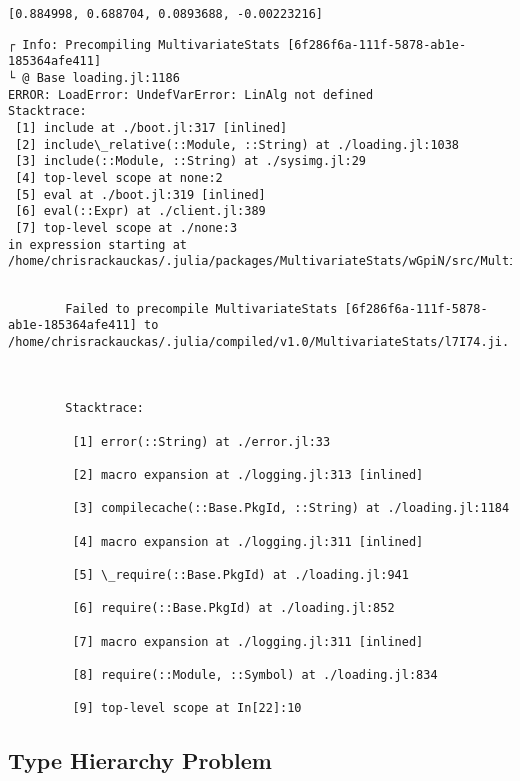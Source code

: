 \documentclass[11pt]{article}
\begin{document}
    \begin{Verbatim}[commandchars=\\\{\}]
[0.884998, 0.688704, 0.0893688, -0.00223216]

    \end{Verbatim}

    \begin{Verbatim}[commandchars=\\\{\}]
┌ Info: Precompiling MultivariateStats [6f286f6a-111f-5878-ab1e-185364afe411]
└ @ Base loading.jl:1186
ERROR: LoadError: UndefVarError: LinAlg not defined
Stacktrace:
 [1] include at ./boot.jl:317 [inlined]
 [2] include\_relative(::Module, ::String) at ./loading.jl:1038
 [3] include(::Module, ::String) at ./sysimg.jl:29
 [4] top-level scope at none:2
 [5] eval at ./boot.jl:319 [inlined]
 [6] eval(::Expr) at ./client.jl:389
 [7] top-level scope at ./none:3
in expression starting at /home/chrisrackauckas/.julia/packages/MultivariateStats/wGpiN/src/MultivariateStats.jl:8

    \end{Verbatim}

    \begin{Verbatim}[commandchars=\\\{\}]

        Failed to precompile MultivariateStats [6f286f6a-111f-5878-ab1e-185364afe411] to /home/chrisrackauckas/.julia/compiled/v1.0/MultivariateStats/l7I74.ji.

        

        Stacktrace:

         [1] error(::String) at ./error.jl:33

         [2] macro expansion at ./logging.jl:313 [inlined]

         [3] compilecache(::Base.PkgId, ::String) at ./loading.jl:1184

         [4] macro expansion at ./logging.jl:311 [inlined]

         [5] \_require(::Base.PkgId) at ./loading.jl:941

         [6] require(::Base.PkgId) at ./loading.jl:852

         [7] macro expansion at ./logging.jl:311 [inlined]

         [8] require(::Module, ::Symbol) at ./loading.jl:834

         [9] top-level scope at In[22]:10

    \end{Verbatim}

    \subsection{Type Hierarchy Problem}\label{type-hierarchy-problem}
\end{document}
